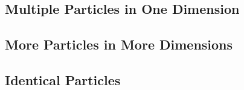 \subsection{Multiple Particles in One Dimension}

\subsection{More Particles in More Dimensions}

\subsection{Identical Particles}
